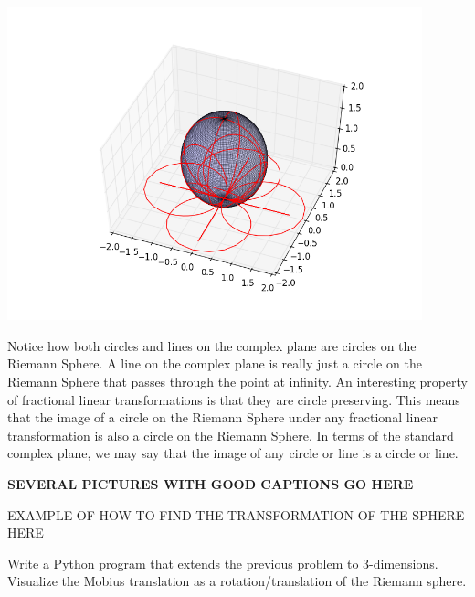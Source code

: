 \includegraphics[width=120mm]{mobius3.png}

Notice how both circles and lines on the complex plane are circles on the Riemann Sphere. A line on the complex plane is really just a circle on the Riemann Sphere that passes through the point at infinity. An interesting property of fractional linear transformations is that they are circle preserving. This means that the image of a circle on the Riemann Sphere under any fractional linear transformation is also a circle on the Riemann Sphere. In terms of the standard complex plane, we may say that the image of any circle or line is a circle or line.

{\bf SEVERAL PICTURES WITH GOOD CAPTIONS GO HERE}

EXAMPLE OF HOW TO FIND THE TRANSFORMATION OF THE SPHERE HERE

\begin{problem}  Write a Python program that extends the previous problem to 3-dimensions.  Visualize the Mobius translation as a rotation/translation of the Riemann sphere.
\end{problem}




